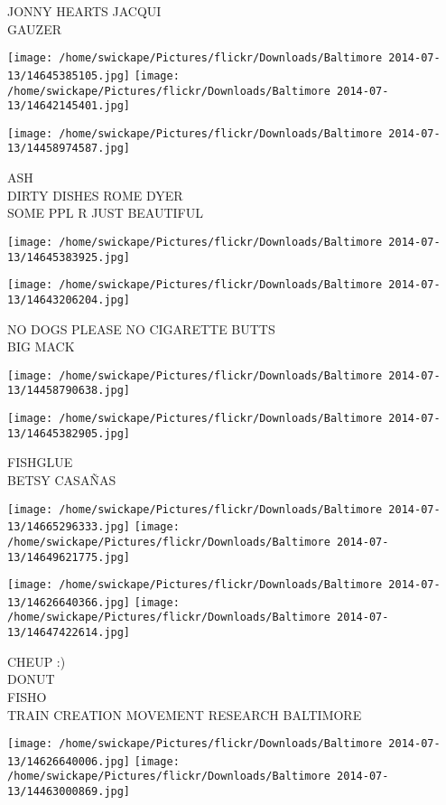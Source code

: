 \documentclass[10pt,letterpaper]{article}
\begin{document}
JONNY HEARTS JACQUI\\
GAUZER
\pagebreak

\texttt{[image: /home/swickape/Pictures/flickr/Downloads/Baltimore 2014-07-13/14645385105.jpg]}
\texttt{[image: /home/swickape/Pictures/flickr/Downloads/Baltimore 2014-07-13/14642145401.jpg]}

\texttt{[image: /home/swickape/Pictures/flickr/Downloads/Baltimore 2014-07-13/14458974587.jpg]}

ASH\\
DIRTY DISHES ROME DYER\\
SOME PPL R JUST BEAUTIFUL
\pagebreak

\texttt{[image: /home/swickape/Pictures/flickr/Downloads/Baltimore 2014-07-13/14645383925.jpg]}

\vspace{0.25in}
\texttt{[image: /home/swickape/Pictures/flickr/Downloads/Baltimore 2014-07-13/14643206204.jpg]}

NO DOGS PLEASE NO CIGARETTE BUTTS\\
BIG MACK
\pagebreak

\texttt{[image: /home/swickape/Pictures/flickr/Downloads/Baltimore 2014-07-13/14458790638.jpg]}

\vspace{0.25in}
\texttt{[image: /home/swickape/Pictures/flickr/Downloads/Baltimore 2014-07-13/14645382905.jpg]}

FISHGLUE\\
BETSY CASAÑAS
\pagebreak

\texttt{[image: /home/swickape/Pictures/flickr/Downloads/Baltimore 2014-07-13/14665296333.jpg]}
\texttt{[image: /home/swickape/Pictures/flickr/Downloads/Baltimore 2014-07-13/14649621775.jpg]}

\texttt{[image: /home/swickape/Pictures/flickr/Downloads/Baltimore 2014-07-13/14626640366.jpg]}
\texttt{[image: /home/swickape/Pictures/flickr/Downloads/Baltimore 2014-07-13/14647422614.jpg]}

CHEUP :)\\
DONUT\\
FISHO\\
TRAIN CREATION MOVEMENT RESEARCH BALTIMORE
\pagebreak

\texttt{[image: /home/swickape/Pictures/flickr/Downloads/Baltimore 2014-07-13/14626640006.jpg]}
\texttt{[image: /home/swickape/Pictures/flickr/Downloads/Baltimore 2014-07-13/14463000869.jpg]}
\end{document}
